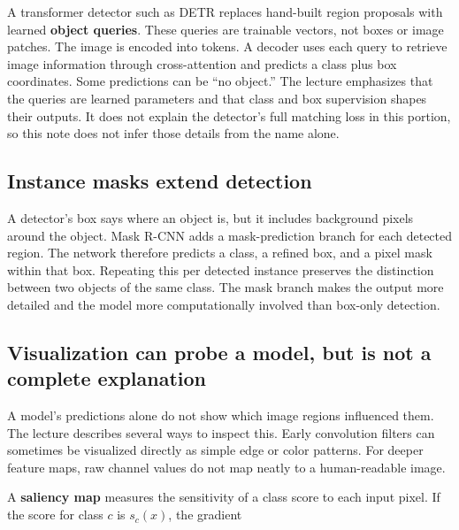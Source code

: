 A transformer detector such as DETR replaces hand-built region proposals with learned \textbf{object queries}. These queries are trainable vectors, not boxes or image patches. The image is encoded into tokens. A decoder uses each query to retrieve image information through cross-attention and predicts a class plus box coordinates. Some predictions can be ``no object.'' The lecture emphasizes that the queries are learned parameters and that class and box supervision shapes their outputs. It does not explain the detector's full matching loss in this portion, so this note does not infer those details from the name alone.

\subsection{Instance masks extend detection}\label{04-visual-computing-ii-ch031-instance-masks-extend-detection}

\hypertarget{04-visual-computing-ii-ch031-instance-masks-extend-detection}{}

A detector's box says where an object is, but it includes background pixels around the object. Mask R-CNN adds a mask-prediction branch for each detected region. The network therefore predicts a class, a refined box, and a pixel mask within that box. Repeating this per detected instance preserves the distinction between two objects of the same class. The mask branch makes the output more detailed and the model more computationally involved than box-only detection.

\subsection{Visualization can probe a model, but is not a complete explanation}\label{04-visual-computing-ii-ch031-visualization-can-probe-a-model-but-is-not-a-complete-explanation}

\hypertarget{04-visual-computing-ii-ch031-visualization-can-probe-a-model-but-is-not-a-complete-explanation}{}

A model's predictions alone do not show which image regions influenced them. The lecture describes several ways to inspect this. Early convolution filters can sometimes be visualized directly as simple edge or color patterns. For deeper feature maps, raw channel values do not map neatly to a human-readable image.

A \textbf{saliency map} measures the sensitivity of a class score to each input pixel. If the score for class \(c\) is \(s_c(x)\), the gradient

